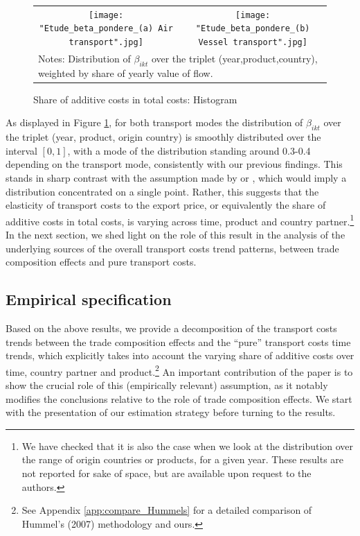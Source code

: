 \documentclass[a4paper,11pt]{article}
\begin{document}
\begin{figure}[htbp]
\caption{Share of additive costs in total costs: Histogram}
\label{fig:histogram_beta}
\begin{center}
\begin{tabular}{cc}
\texttt{[image: "Etude\_beta\_pondere\_(a) Air transport".jpg]}
& \texttt{[image: "Etude\_beta\_pondere\_(b) Vessel transport".jpg]} \\
\multicolumn{2}{l}{{\footnotesize Notes: Distribution of $\beta_{ikt}$ over the triplet (year,product,country), weighted by share of yearly value of flow.}}\\
\end{tabular}
\end{center}
\end{figure}

As displayed in Figure \ref{fig:histogram_beta}, for both transport modes the distribution of $\beta_{ikt}$ over the triplet (year, product, origin country) is smoothly distributed over the interval $[0,1]$, with a mode of the distribution standing around 0.3-0.4 depending on the transport mode, consistently with our previous findings.
This stands in sharp contrast with the assumption made by  \cite{hummels_skiba} or \cite{hummels2007}, which would imply a distribution concentrated on a single point.
Rather, this suggests that the elasticity of transport costs to the export price, or equivalently the share of additive costs in total costs, is varying across time, product and country partner.\footnote{We have checked that it is also the case when we look at the distribution over the range of origin countries or products, for a given year.
These results are not reported for sake of space, but are available upon request to the authors.} In the next section, we shed light on the role of this result in the analysis of the underlying sources of the overall transport costs trend patterns, between trade composition effects and pure transport costs.

\subsection{Empirical specification}

Based on the above results, we provide a decomposition of the transport costs trends between the trade composition effects and the ``pure'' transport costs time trends, which explicitly takes into account the varying share of additive costs over time, country partner and product.\footnote{See Appendix \ref{app:compare_Hummels} for a detailed comparison of Hummel's (2007) methodology and ours.} An important contribution of the paper is to show the crucial role of this (empirically relevant) assumption, as it notably modifies the conclusions relative to the role of trade composition effects.
We start with the presentation of our estimation strategy before turning to the results.\smallskip
\end{document}
